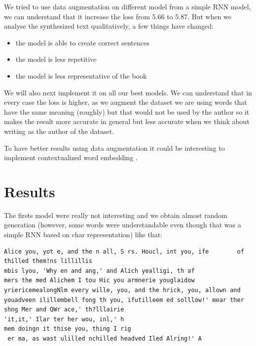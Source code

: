 \documentclass{article}
\begin{document}
We tried to use data augmentation on different model from a simple RNN model, we can understand that it increase the loss from 5.66 to 5.87. But when we analyse the synthesized text qualitatively, a few things have changed:
\begin{itemize}
    \item the model is able to create correct sentences
    \item the model is less repetitive 
    \item the model is less representative of the book
\end{itemize}
We will also next implement it on all our best models. 
We can understand that in every case the loss is higher, as we augment the dataset we are using words that have the same meaning (roughly) but that would not be used by the author so it makes the result more accurate in general but less accurate when we think about writing as the author of the dataset.

To have better results using data augmentation it could be interesting to implement contextualized word embedding \cite{wordrep}.



\section{Results}

The firsts model were really not interesting and we obtain almost random generation (however, some words were understandable even though that was a simple RNN based on char representation) like that:
\begin{lstlisting}[breaklines]
Alice you, yot e, and the n all, S rs. Houcl, int you, ife        of thilled them!ns lillillis
mbis lyou, 'Why en and ang,' and Alich yealligi, th af
mers the med Alichem I tou Hic you armnerie youglaidow yriericemealongNlm every wille, you, and the hrick, you, allown and youadveen ilillembell fong th you, ifutilleem ed solllow!' mear ther shng Mer and QWr ace,' th?lllairie
'it,it,' Ilar ter her wou, inl,' h
mem doingn it thise you, thing I rig
 er ma, as wast ulilled nchilled headved Iled Alring!' A
\end{lstlisting}
\end{document}
